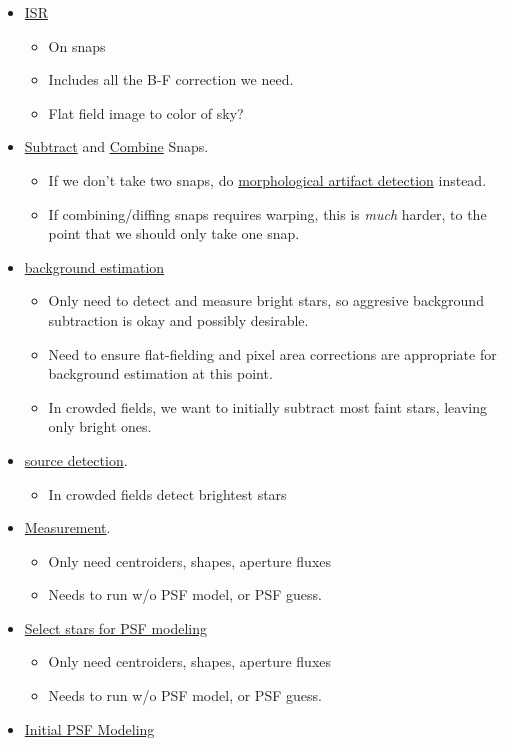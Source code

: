 \begin{itemize}
\item \hyperref[sec:acISR]{ISR}
  \begin{itemize}
  \item On snaps
  \item Includes all the B-F correction we need.
  \item Flat field image to color of sky?
  \end{itemize}
\item \hyperref[sec:acSnapSubtraction]{Subtract} and \hyperref[sec:acCoaddition]{Combine} Snaps.
  \begin{itemize}
  \item If we don't take two snaps, do \hyperref[sec:acMorphogicalArtifactDetection]{morphological artifact detection} instead.
  \item If combining/diffing snaps requires warping, this is \emph{much} harder, to the point that we should only take one snap.
  \end{itemize}
\item \hyperref[sec:acBackgroundEstimation]{background estimation}
  \begin{itemize}
  \item Only need to detect and measure bright stars, so aggresive background subtraction is okay and possibly desirable.
  \item Need to ensure flat-fielding and pixel area corrections are appropriate for background estimation at this point.
  \item In crowded fields, we want to initially subtract most faint stars, leaving only bright ones.
  \end{itemize}
\item \hyperref[sec:acSourceDetection]{source detection}.
  \begin{itemize}
  \item In crowded fields detect brightest stars
  \end{itemize}
\item \hyperref[sec:SingleVisitMeasurement]{Measurement}.
  \begin{itemize}
  \item Only need centroiders, shapes, aperture fluxes
  \item Needs to run w/o PSF model, or PSF guess.
  \end{itemize}
\item \hyperref[sec:acPSFStarSelection]{Select stars for PSF modeling}
  \begin{itemize}
  \item Only need centroiders, shapes, aperture fluxes
  \item Needs to run w/o PSF model, or PSF guess.
  \end{itemize}
\item \hyperref[sec:acSingleCCDPSF]{Initial PSF Modeling}
\end{itemize}

